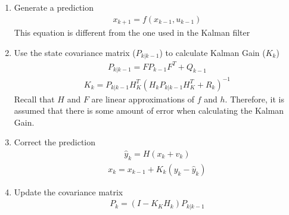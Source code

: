 \begin{enumerate}
  \item Generate a prediction 
  \begin{align*}
      x_{k+1} = f( x_{k-1} , u_{k-1})  
  \end{align*} 
  This equation is different from the one used in the Kalman filter 
  \item Use the state covariance matrix ($P_{k | k - 1}$) to calculate Kalman Gain ($K_k$) 
    \begin{align*} 
        P_{k | k -1} = F P_{k - 1} F^T + Q_{k-1} 
        \end{align*}
         \begin{align*} 
        K_k = P_{k | k - 1} H^T_K (H_k P_{k | k - 1} H^T_K + R_k)^{-1}
    \end{align*}
    Recall that $H$ and $F$ are linear approximations of $f$ and $h$. Therefore, it is assumed that there is some amount of error when calculating the Kalman Gain.
    
    \item  Correct the prediction
    \begin{align*}
        \hat y_k = H( x_k + v_k )
    \end{align*}
     \begin{align*} 
        x_k = x_{k - 1} + K_k(y_k - \hat y_k)
    \end{align*}
    \item Update the covariance matrix
    \begin{align*} 
        P_k = (I - K_K H_k) P_{k | k-1}
    \end{align*}
\end{enumerate} 

